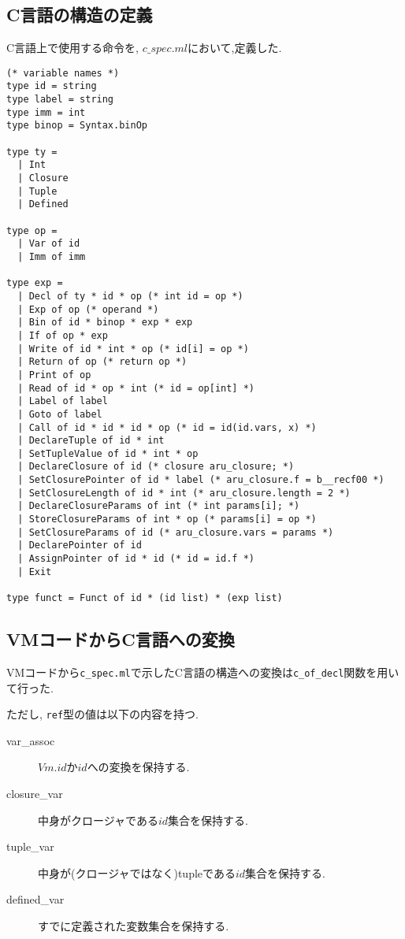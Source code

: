 \subsection*{C言語の構造の定義}

C言語上で使用する命令を, $c\_spec.ml$において,定義した.

\begin{lstlisting}[caption=c\_spec.mlにおけるC言語の構造定義]
(* variable names *)
type id = string
type label = string
type imm = int
type binop = Syntax.binOp

type ty = 
  | Int
  | Closure 
  | Tuple 
  | Defined

type op =
  | Var of id
  | Imm of imm

type exp = 
  | Decl of ty * id * op (* int id = op *)
  | Exp of op (* operand *)
  | Bin of id * binop * exp * exp 
  | If of op * exp 
  | Write of id * int * op (* id[i] = op *)
  | Return of op (* return op *)
  | Print of op
  | Read of id * op * int (* id = op[int] *)
  | Label of label
  | Goto of label
  | Call of id * id * id * op (* id = id(id.vars, x) *)
  | DeclareTuple of id * int
  | SetTupleValue of id * int * op
  | DeclareClosure of id (* closure aru_closure; *)
  | SetClosurePointer of id * label (* aru_closure.f = b__recf00 *)
  | SetClosureLength of id * int (* aru_closure.length = 2 *)
  | DeclareClosureParams of int (* int params[i]; *)
  | StoreClosureParams of int * op (* params[i] = op *)
  | SetClosureParams of id (* aru_closure.vars = params *)
  | DeclarePointer of id
  | AssignPointer of id * id (* id = id.f *)
  | Exit

type funct = Funct of id * (id list) * (exp list)
\end{lstlisting}

\subsection*{VMコードからC言語への変換}

VMコードから\lstinline{c_spec.ml}で示したC言語の構造への変換は\lstinline{c_of_decl}関数を用いて行った.

ただし, \lstinline{ref}型の値は以下の内容を持つ.

\begin{description}

\item[var\_assoc] \hfill

$Vm.id$か$id$への変換を保持する.

\item[closure\_var] \hfill

中身がクロージャである$id$集合を保持する.

\item[tuple\_var]  \hfill

中身が(クロージャではなく)tupleである$id$集合を保持する.

\item[defined\_var] \hfill

すでに定義された変数集合を保持する.

\end{description}

